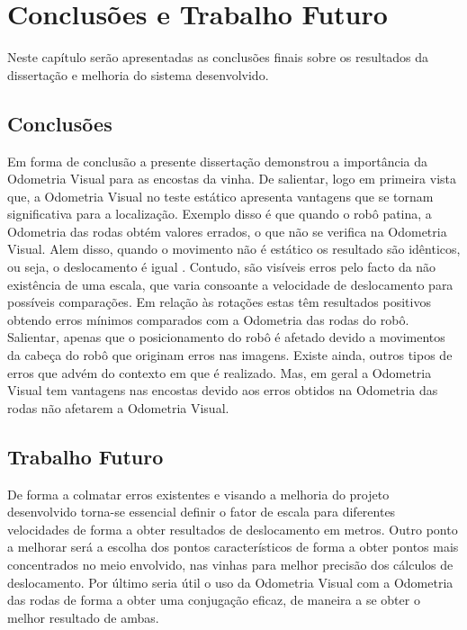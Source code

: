 \chapter{Conclusões e Trabalho Futuro} \label{chap:conclF}

Neste capítulo serão apresentadas as conclusões finais sobre os resultados da dissertação e melhoria do sistema desenvolvido.

\section{Conclusões}


Em forma de conclusão a presente dissertação demonstrou a importância da Odometria Visual para as encostas da vinha.
De salientar, logo em primeira vista que, a Odometria Visual no teste  estático apresenta vantagens  que se tornam significativa para a localização. Exemplo disso  é que quando o robô patina, a Odometria das rodas obtém valores errados, o que não se verifica na Odometria Visual.
Alem disso, quando o movimento não é estático os resultado são idênticos, ou seja, o deslocamento é igual . Contudo, são visíveis erros pelo facto da não existência de uma escala, que varia consoante a velocidade de deslocamento para possíveis comparações.
Em relação às rotações estas têm resultados positivos obtendo erros mínimos comparados com a Odometria das rodas do robô. Salientar, apenas que o posicionamento do robô é afetado devido a movimentos da cabeça do robô que originam erros nas imagens.
Existe ainda,  outros tipos de erros que advém do contexto em que é realizado. Mas, em geral a Odometria Visual tem vantagens nas encostas devido aos erros obtidos na Odometria das rodas não afetarem a Odometria Visual.

\section{Trabalho Futuro}


De forma a colmatar erros existentes e visando a melhoria do projeto desenvolvido torna-se essencial definir o fator de escala para diferentes velocidades de forma a obter resultados de deslocamento em metros. Outro ponto a melhorar será a escolha dos pontos característicos de forma a obter pontos mais concentrados no meio envolvido, nas vinhas para melhor precisão dos cálculos de deslocamento. Por último seria útil o uso da Odometria Visual com a Odometria das rodas de forma a obter uma conjugação eficaz, de maneira a se obter o melhor resultado de ambas.